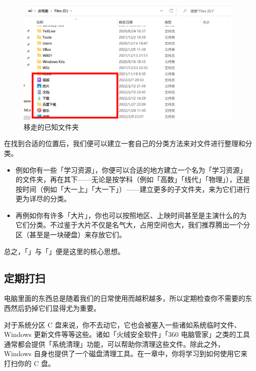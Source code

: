 {{{{{\begin{figure}[htb!]
  \centering
  \includegraphics[width=.7\textwidth]{assets/basic/Moved_user_directories.png}
  \caption{移走的已知文件夹}
  \label{fig:Moved_user_directories}
\end{figure}

在找到合适的位置后，我们便可以建立一套自己的分类方法来对文件进行整理和分类。

\begin{itemize}
  \item 例如你有一些「学习资源」，你便可以合适的地方建立一个名为「学习资源」的文件夹，再在其下——无论是按学科（例如「高数」「线代」「物理」），还是按时间（例如「大一上」「大一下」）——建立更多的子文件夹，来为它们进行更为详尽的分类。
  \item 再例如你有许多「大片」，你也可以按照地区、上映时间甚至是主演什么的为它们分类。不过鉴于大片不仅是名气大，占用空间也大，我们推荐腾出一个分区（甚至是一块硬盘）来存放它们。
\end{itemize}

总之，「」与「」便是这里的核心思想。

\subsection{定期打扫}

电脑里面的东西总是随着我们的日常使用而越积越多，所以定期检查你不需要的东西然后扔掉它们显得尤为重要。

对于系统分区 C 盘来说，你不去动它，它也会被塞入一些诸如系统临时文件、Windows 更新文件等等这些。诸如「火绒安全软件」「360 电脑管家」之类的工具通常都会提供「系统清理」功能，可以帮助你清理这些文件。除此之外，Windows 自身也提供了一个磁盘清理工具。在一章中，你将学习到如何使用它来打扫你的 C 盘。

}}}}}
